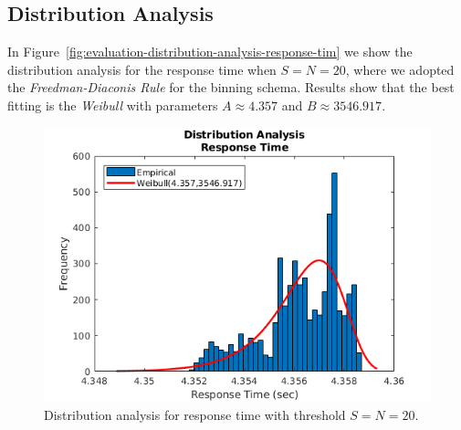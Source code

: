 \subsection{Distribution Analysis}
\label{sec:evaluation-distribution-analysis}
In Figure~\ref{fig:evaluation-distribution-analysis-response-tim} we show the distribution analysis for the response time when $S=N=20$, where we adopted the \textit{Freedman-Diaconis Rule} for the binning schema.
Results show that the best fitting is the \textit{Weibull} with parameters $A\approx4.357$ and $B\approx3546.917$.

\begin{figure}
	\includegraphics[width=\columnwidth]{fig/evaluation-distribution-analysis-response-time}
	\caption{Distribution analysis for response time with threshold $S=N=20$.}
	\label{fig:evaluation-distribution-analysis-response-time}
\end{figure}